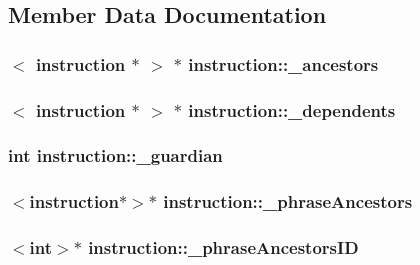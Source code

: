 \subsection{Member Data Documentation}
\hypertarget{classinstruction_ac1dd06cf09542ab004237f1dddd1da02}{
\subsubsection[{\_\-ancestors}]{$<$ {\bf instruction} $\ast$ $>$ $\ast$ {\bf instruction::\_\-ancestors}}}
\label{classinstruction_ac1dd06cf09542ab004237f1dddd1da02}
\hypertarget{classinstruction_a50304cae9052c65b138274a96edfbca0}{
\subsubsection[{\_\-dependents}]{$<$ {\bf instruction} $\ast$ $>$ $\ast$ {\bf instruction::\_\-dependents}}}
\label{classinstruction_a50304cae9052c65b138274a96edfbca0}
\hypertarget{classinstruction_a060702a038491fdd3e98661fec166fa4}{
\subsubsection[{\_\-guardian}]{\setlength{\rightskip}{0pt plus 5cm}int {\bf instruction::\_\-guardian}}}
\label{classinstruction_a060702a038491fdd3e98661fec166fa4}
\hypertarget{classinstruction_a728468d228311067d26e390b263dc140}{
\subsubsection[{\_\-phraseAncestors}]{$<${\bf instruction}$\ast$$>$$\ast$ {\bf instruction::\_\-phraseAncestors}}}
\label{classinstruction_a728468d228311067d26e390b263dc140}
\hypertarget{classinstruction_a2631d0b5947d06f6ff13170e6dc88f78}{
\subsubsection[{\_\-phraseAncestorsID}]{$<$int$>$$\ast$ {\bf instruction::\_\-phraseAncestorsID}}}
\label{classinstruction_a2631d0b5947d06f6ff13170e6dc88f78}


